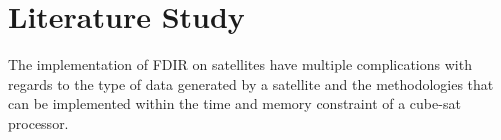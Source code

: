 \chapter{Literature Study}
\label{chap:Literature Study}

The implementation of FDIR on satellites have multiple complications with regards to the type of data generated by a satellite and the methodologies that can be implemented within the time and memory constraint of a cube-sat processor.

%
%
%
%
%
%
%

